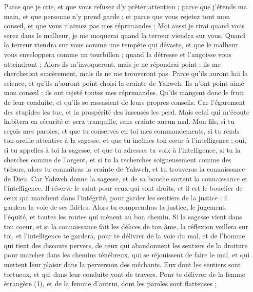 \begin{multicols}{2}
Parce que je crie, et que vous refusez d’y prêter attention ; parce que j’étends ma main, et que personne n’y prend garde ;
et parce que vous rejetez tout mon conseil, et que vous n’aimez pas mes réprimandes ;
Moi aussi je rirai quand vous serez dans le malheur, je me moquerai quand la terreur viendra sur vous.
Quand la terreur viendra sur vous comme une tempête qui dévaste, et que le malheur vous enveloppera comme un tourbillon ; quand la détresse et l'angoisse vous atteindront ;
Alors ils m’invoqueront, mais je ne répondrai point ; ils me chercheront sincèrement, mais ils ne me trouveront pas.
Parce qu'ils auront haï la science, et qu'ils n'auront point choisi la crainte de Yahweh.
Ils n'ont point aimé mon conseil ; ils ont rejeté toutes mes réprimandes.
Qu'ils mangent donc le fruit de leur conduite, et qu'ils se rassasient de leurs propres conseils.
Car l’égarement des stupides les tue, et la prospérité des insensés les perd.
Mais celui qui m'écoute habitera en sécurité et sera tranquille, sans crainte aucun mal.
\VerseOne{}Mon fils, si tu reçois mes paroles, et que tu conserves en toi mes commandements,
si tu rends ton oreille attentive à la sagesse, et que tu inclines ton cœur à l'intelligence ;
oui, si tu appelles à toi la sagesse, et que tu adresses ta voix à l'intelligence,
si tu la cherches comme de l'argent, et si tu la recherches soigneusement comme des trésors,
alors tu connaîtras la crainte de Yahweh, et tu trouveras la connaissance de Dieu.
Car Yahweh donne la sagesse, et de sa bouche sortent la connaissance et l'intelligence.
Il réserve le salut pour ceux qui sont droits, et il est le bouclier de ceux qui marchent dans l'intégrité,
pour garder les sentiers de la justice ; il gardera la voie de ses fidèles.
Alors tu comprendras la justice, le jugement, l'équité, et toutes les routes qui mènent au bon chemin.
Si la sagesse vient dans ton coeur, et si la connaissance fait les délices de ton âme,
la réflexion veillera sur toi, et l'intelligence te gardera,
pour te délivrer de la voie du mal, et de l'homme qui tient des discours pervers,
de ceux qui abandonnent les sentiers de la droiture pour marcher dans les chemins ténébreux,
qui se réjouissent de faire le mal, et qui mettent leur plaisir dans la perversion des méchants.
Eux dont les sentiers sont tortueux, et qui dans leur conduite vont de travers.
Pour te délivrer de la femme étrangère (1), et de la femme d'autrui, dont les paroles sont flatteuses ;

\end{multicols}
